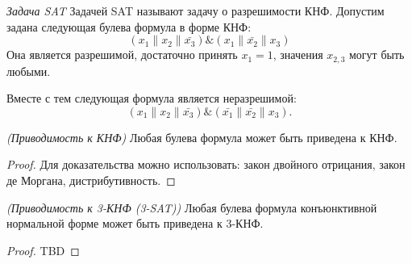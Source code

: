 \begin{example}
\emph{Задача SAT}
\label{exAddAlgoSAT}
Задачей SAT называют задачу о разрешимости КНФ. Допустим задана
следующая булева формула в форме КНФ:
\begin{equation}
\left(x_1 \| x_2 \| \bar{x_3} \right) \& \left(x_1 \| \bar{x_2} \| x_3 \right)
\nonumber
\end{equation}
Она является разрешимой, достаточно принять $x_1 = 1$, значения
$x_{2,3}$ могут быть любыми.

Вместе с тем следующая формула является неразрешимой:
\begin{equation}
\left(x_1 \| x_2 \| \bar{x_3} \right) \& 
\left(\bar{x_1} \| \bar{x_2} \| x_3 \right).
\nonumber
\end{equation}

\end{example}

\begin{theorem}
\emph{(Приводимость к КНФ)}
Любая булева формула может быть приведена к КНФ. 
\end{theorem}

\begin{proof}
Для доказательства можно использовать: закон двойного отрицания, закон
де Моргана, дистрибутивность.
\end{proof}

\begin{theorem}
\emph{(Приводимость к 3-КНФ (3-SAT))}
Любая булева формула конъюнктивной нормальной форме может быть
приведена к 3-КНФ.  
\end{theorem}

\begin{proof}
TBD
\end{proof}


